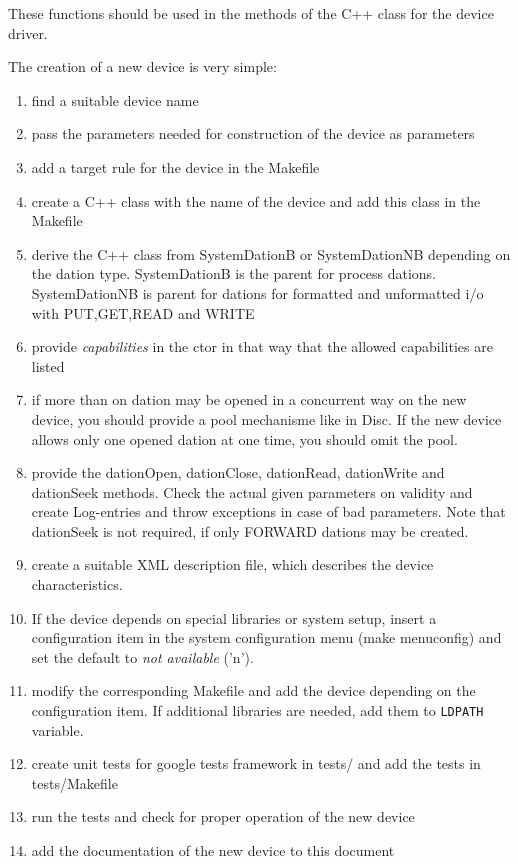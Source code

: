 These functions should be used in the methods of the C++ class 
for the device driver.


The creation of a new device is very simple:
\begin{enumerate}
\item find a suitable device name
\item pass the parameters needed for construction of the device as
      parameters
\item add a target rule for the device in the Makefile
\item create a C++ class with the name of the device and add this class
      in the Makefile
\item derive the C++ class from SystemDationB or SystemDationNB depending
      on the dation type. SystemDationB is the parent for process dations.
      SystemDationNB is parent for dations for formatted and unformatted
      i/o with PUT,GET,READ and WRITE
\item provide {\em capabilities} in the ctor in that way that the allowed
      capabilities are listed
\item if more than on dation may be opened in a concurrent way on the new
      device, you should provide a pool mechanisme like in Disc.
      If the new device allows only one opened dation at one time, you 
      should omit the pool.
\item provide the dationOpen, dationClose, dationRead, dationWrite 
      and dationSeek methods. Check the actual given parameters on
      validity and create Log-entries and throw exceptions in case
      of bad parameters.
      Note that dationSeek is not required, if only FORWARD dations
      may be created.
\item create a suitable XML description file, which describes the
      device characteristics.
\item If the device depends on special libraries or 
      system setup, insert a configuration item  
      in the system configuration menu (make menuconfig)
      and set the default to {\em not available} ('n').
\item modify the corresponding Makefile and add the device depending on
      the configuration item. If additional libraries are needed,
      add them to \texttt{LDPATH} variable. 
\item create unit tests for google tests framework in tests/ and add the
      tests in tests/Makefile
\item run the tests and check for proper operation of the new device
\item add the documentation of the new device to this document
\end{enumerate}

